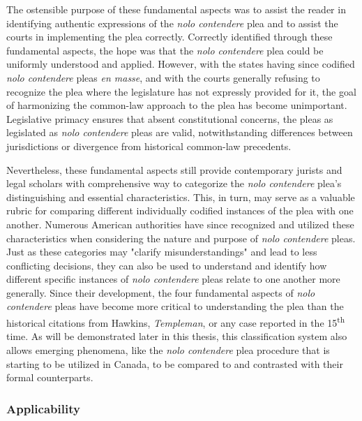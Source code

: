 The ostensible purpose of these fundamental aspects was to assist the reader in identifying authentic expressions of the \textit{nolo contendere} plea and to assist the courts in implementing the plea correctly. Correctly identified through these fundamental aspects, the hope was that the \textit{nolo contendere} plea could be uniformly understood and applied. However, with the states having since codified \textit{nolo contendere} pleas \textit{en masse}, and with the courts generally refusing to recognize the plea where the legislature has not expressly provided for it, the goal of harmonizing the common-law approach to the plea has become unimportant. Legislative primacy ensures that absent constitutional concerns, the pleas as legislated as \textit{nolo contendere} pleas are valid, notwithstanding differences between jurisdictions or divergence from historical common-law precedents.

Nevertheless, these fundamental aspects still provide contemporary jurists and legal scholars with comprehensive way to categorize the \textit{nolo contendere} plea's distinguishing and essential characteristics. This, in turn, may serve as a valuable rubric for comparing different individually codified instances of the plea with one another. Numerous American authorities have since recognized and utilized these characteristics when considering the nature and purpose of \textit{nolo contendere} pleas. Just as these categories may "clarify misunderstandings" and lead to less conflicting decisions, they can also be used to understand and identify how different specific instances of \textit{nolo contendere} pleas relate to one another more generally. Since their development, the four fundamental aspects of \textit{nolo contendere} pleas have become more critical to understanding the plea than the historical citations from Hawkins, \textit{Templeman}, or any case reported in the 15\textsuperscript{th} time. As will be demonstrated later in this thesis, this classification system also allows emerging phenomena, like the \textit{nolo contendere} plea procedure that is starting to be utilized in Canada, to be compared to and contrasted with their formal counterparts.

\subsubsection{Applicability}

